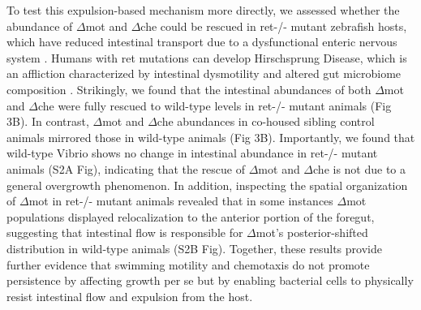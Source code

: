 To test this expulsion-based mechanism more directly, we assessed whether the abundance of $\Delta$mot and $\Delta$che could be rescued in ret-/- mutant zebrafish hosts, which have reduced intestinal transport due to a dysfunctional enteric nervous system \cite{wiles_host_2016,ganz_image_2018}. Humans with ret mutations can develop Hirschsprung Disease, which is an affliction characterized by intestinal dysmotility and altered gut microbiome composition \cite{gosain_hirschsprungs_2015,heanue_enteric_2007}. Strikingly, we found that the intestinal abundances of both $\Delta$mot and $\Delta$che were fully rescued to wild-type levels in ret-/- mutant animals (Fig 3B). In contrast, $\Delta$mot and $\Delta$che abundances in co-housed sibling control animals mirrored those in wild-type animals (Fig 3B). Importantly, we found that wild-type Vibrio shows no change in intestinal abundance in ret-/- mutant animals (S2A Fig), indicating that the rescue of $\Delta$mot and $\Delta$che is not due to a general overgrowth phenomenon. In addition, inspecting the spatial organization of $\Delta$mot in ret-/- mutant animals revealed that in some instances $\Delta$mot populations displayed relocalization to the anterior portion of the foregut, suggesting that intestinal flow is responsible for $\Delta$mot's posterior-shifted distribution in wild-type animals (S2B Fig). Together, these results provide further evidence that swimming motility and chemotaxis do not promote persistence by affecting growth per se but by enabling bacterial cells to physically resist intestinal flow and expulsion from the host. 


